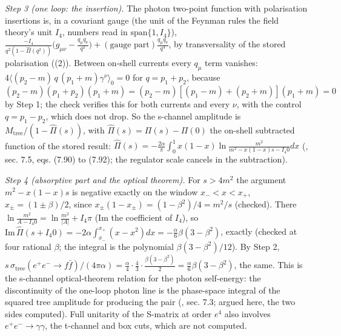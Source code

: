 \emph{Step 3 (one loop: the insertion).} The photon two-point function with polarisation insertions is, in a covariant gauge (the unit of the Feynman rules the field theory's unit $I_{4}$, numbers read in $\mathrm{span}\{1, I_{4}\}$), $\frac{-I_{4}}{q^{2}(1 - \hat\Pi(q^{2}))}\bigl(g_{\mu\nu} - \frac{q_{\mu}q_{\nu}}{q^{2}}\bigr) + (\text{gauge part})\frac{q_{\mu}q_{\nu}}{q^{4}}$, by transversality of the stored polarisation ((2)). Between on-shell currents every $q_{\mu}$ term vanishes: $4\langle(p_{2} - m)\,q\,(p_{1} + m)\gamma^{\nu}\rangle_{0} = 0$ for $q = p_{1} + p_{2}$, because $(p_{2} - m)(p_{1} + p_{2})(p_{1} + m) = (p_{2} - m)[(p_{1} - m) + (p_{2} + m)](p_{1} + m) = 0$ by Step 1; the check verifies this for both currents and every $\nu$, with the control $q = p_{1} - p_{2}$, which does not drop. So the s-channel amplitude is $M_{\mathrm{tree}}/(1 - \hat\Pi(s))$, with $\hat\Pi(s) = \Pi(s) - \Pi(0)$ the on-shell subtracted function of the stored result: $\hat\Pi(s) = -\tfrac{2\alpha}{\pi}\int_{0}^{1}x(1 - x)\ln\frac{m^{2}}{m^{2} - x(1-x)s - I_{4}0}dx$ (\cite{PeskinSchroeder1995}, sec. 7.5, eqs. (7.90) to (7.92); the regulator scale cancels in the subtraction).

\emph{Step 4 (absorptive part and the optical theorem).} For $s > 4m^{2}$ the argument $m^{2} - x(1-x)s$ is negative exactly on the window $x_{-} < x < x_{+}$, $x_{\pm} = (1 \pm \beta)/2$, since $x_{\pm}(1 - x_{\pm}) = (1 - \beta^{2})/4 = m^{2}/s$ (checked). There $\ln\frac{m^{2}}{A - I_{4}0} = \ln\frac{m^{2}}{|A|} + I_{4}\pi$ ($\mathrm{Im}$ the coefficient of $I_{4}$), so $\mathrm{Im}\,\hat\Pi(s + I_{4}0) = -2\alpha\int_{x_{-}}^{x_{+}}(x - x^{2})dx = -\tfrac{\alpha}{6}\beta(3 - \beta^{2})$, exactly (checked at four rational $\beta$; the integral is the polynomial $\beta(3 - \beta^{2})/12$). By Step 2, $s\,\sigma_{\mathrm{tree}}(e^{+}e^{-} \to f\bar f)/(4\pi\alpha) = \tfrac{\alpha}{4}\cdot\tfrac43\cdot\tfrac{\beta(3 - \beta^{2})}{2} = \tfrac{\alpha}{6}\beta(3 - \beta^{2})$, the same. This is the s-channel optical-theorem relation for the photon self-energy: the discontinuity of the one-loop photon line is the phase-space integral of the squared tree amplitude for producing the pair (\cite{PeskinSchroeder1995}, sec. 7.3; argued here, the two sides computed). Full unitarity of the S-matrix at order $e^{4}$ also involves $e^{+}e^{-} \to \gamma\gamma$, the t-channel and box cuts, which are not computed.

